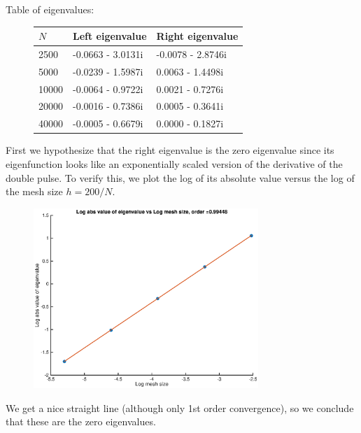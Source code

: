 \documentclass[12pt]{article}
\begin{document}
Table of eigenvalues:
\begin{figure}[H]
\begin{tabular}{l|ll}
$N$     & Left eigenvalue     &  Right eigenvalue  \\ \hline
2500    &  -0.0663 - 3.0131i  & -0.0078 - 2.8746i  \\
5000    &  -0.0239 - 1.5987i  &  0.0063 - 1.4498i  \\
10000   &  -0.0064 - 0.9722i  &  0.0021 - 0.7276i  \\
20000   &  -0.0016 - 0.7386i  &  0.0005 - 0.3641i  \\
40000   &  -0.0005 - 0.6679i  &  0.0000 - 0.1827i  \\       
\end{tabular}
\end{figure}

First we hypothesize that the right eigenvalue is the zero eigenvalue since its eigenfunction looks like an exponentially scaled version of the derivative of the double pulse. To verify this, we plot the log of its absolute value versus the log of the mesh size $h = 200/N$.
\begin{figure}[H]
\includegraphics[width=8.5cm]{double2logplotright.eps}
\end{figure}
We get a nice straight line (although only 1st order convergence), so we conclude that these are the zero eigenvalues. \\
\end{document}
